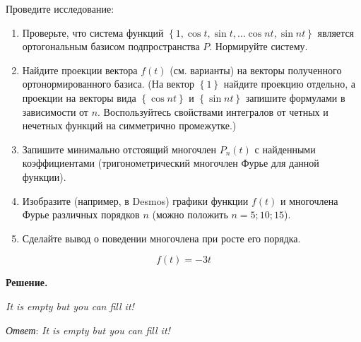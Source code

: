 Проведите исследование:
\begin{enumerate}
	\item Проверьте, что система функций $\left\{1,\cos{t},\sin{t},\ldots\cos{n}t,\sin{n}t\right\}$ является ортогональным базисом подпространства $P$. Нормируйте систему.
	\item Найдите проекции вектора $f\left(t\right)$ (см. варианты) на векторы полученного ортонормированного базиса.
(На вектор $\left\{1\right\}$ найдите проекцию отдельно, а проекции на векторы вида $\left\{\cos{n}t\right\}$ и $\left\{\sin{n}t\right\}$ запишите формулами в зависимости от $n$. Воспользуйтесь свойствами интегралов от четных и нечетных функций на симметрично промежутке.)
	\item Запишите минимально отстоящий многочлен $P_n\left(t\right)$ с найденными коэффициентами (тригонометрический многочлен Фурье для данной функции).
	\item Изобразите (например, в Desmos) графики функции $f\left(t\right)$ и многочлена Фурье различных порядков $n$ (можно положить $n=5;10;15$).
	\item Сделайте вывод о поведении многочлена при росте его порядка.
\end{enumerate}

\[f\left(t\right)=-3t\]

\vspace{10mm}

\textbf{Решение.}

\textit{It is empty but you can fill it!}

\textit{Ответ}: \textit{It is empty but you can fill it!}
\clearpage
